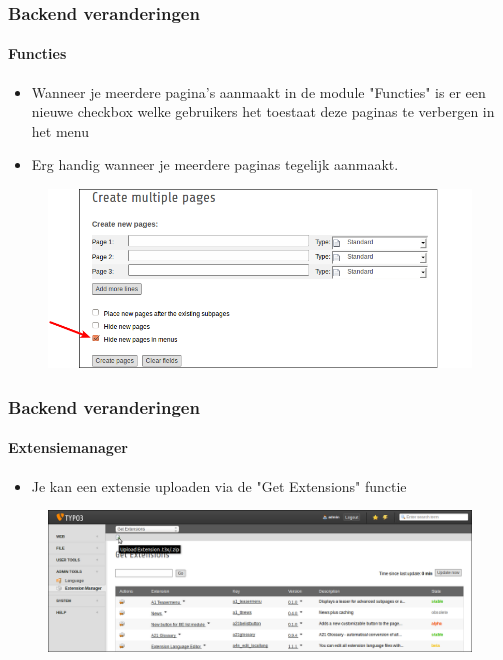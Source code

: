 
\begin{frame}[fragile]
	\frametitle{Backend veranderingen}
	\framesubtitle{Functies}

 	\begin{itemize}
		\item Wanneer je meerdere pagina's aanmaakt in de module "Functies"\newline
			is er een nieuwe checkbox welke gebruikers het toestaat deze paginas \newline
			te verbergen in het menu
		\item Erg handig wanneer je meerdere paginas tegelijk aanmaakt. 
	\end{itemize}

	\begin{figure}
		\includegraphics[width=0.85\linewidth]{Images/BackendChanges/CreateMultiplePagesHideInMenu.png}
	\end{figure}

\end{frame}


\begin{frame}[fragile]
	\frametitle{Backend veranderingen}
	\framesubtitle{Extensiemanager}

 	\begin{itemize}
		\item Je kan een extensie uploaden via de "Get Extensions" functie
	\end{itemize}

	\begin{figure}
		\includegraphics[width=0.95\linewidth]{Images/BackendChanges/UploadExtension.png}
	\end{figure}

\end{frame}

